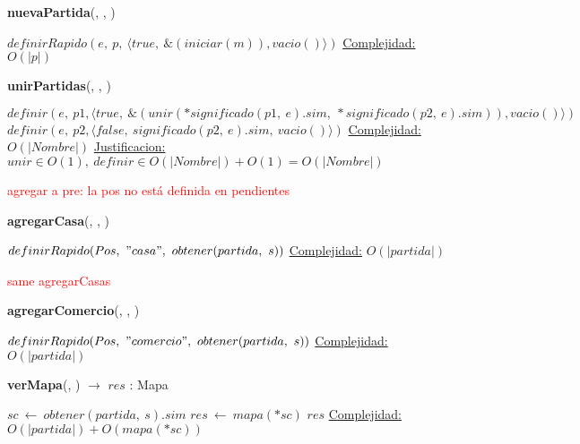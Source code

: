 \begin{Algoritmos}
    \begin{algorithm}[H]{\textbf{nuevaPartida}(, , )}
        \begin{algorithmic}[1]
            \State $definirRapido(e,\ p,\ \langle true,\ \&(iniciar(m)), vacio() \rangle )$ 
            \medskip
            \Statex \underline{Complejidad:} $O(|p|)$
        \end{algorithmic}
    \end{algorithm}

    \begin{algorithm}[H]{\textbf{unirPartidas}(, , )}
        \begin{algorithmic}[1]
            \State $definir(e,\ p1, \langle true,\ \&(unir(*significado(p1,\ e).sim,\ *significado(p2,\ e).sim)), vacio()\rangle)$
            \State $definir(e,\ p2, \langle false,\ significado(p2,\ e).sim,\ vacio() \rangle)$
            \medskip
            \Statex \underline{Complejidad:} $O(|Nombre|)$
            \Statex \underline{Justificacion:} $unir \in O(1),\ definir \in O(|Nombre|) + O(1) = O(|Nombre|)$
        \end{algorithmic}
    \end{algorithm}

    \textcolor{red}{agregar a pre: la pos no está definida en pendientes}
    \begin{algorithm}[H]{\textbf{agregarCasa}(, , )} %
    \begin{algorithmic}[1]
        \State $definirRapido(Pos,\ "casa",\ obtener(partida,\ s))$
        \medskip
        \Statex \underline{Complejidad:} $O(|partida|)$
    \end{algorithmic}
    \end{algorithm}
    
    \textcolor{red}{same agregarCasas}
    \begin{algorithm}[H]{\textbf{agregarComercio}(, , )} %
    \begin{algorithmic}[1]
        \State $definirRapido(Pos,\ "comercio",\ obtener(partida,\ s))$ 
        \medskip
        \Statex \underline{Complejidad:} $O(|partida|)$
    \end{algorithmic}
    \end{algorithm}

    \begin{algorithm}[H]{\textbf{verMapa}(, ) $\to$ $res$ : Mapa}
    \begin{algorithmic}[1]
        \State $sc\ \leftarrow\ obtener(partida,\ s).sim$
        \State $res\ \leftarrow\ mapa(*sc)$ 
        \State \Return $res$
        \medskip
        \Statex \underline{Complejidad:} $O(|partida|) + O(mapa(*sc))$
    \end{algorithmic}
    \end{algorithm}
      

\end{Algoritmos}
